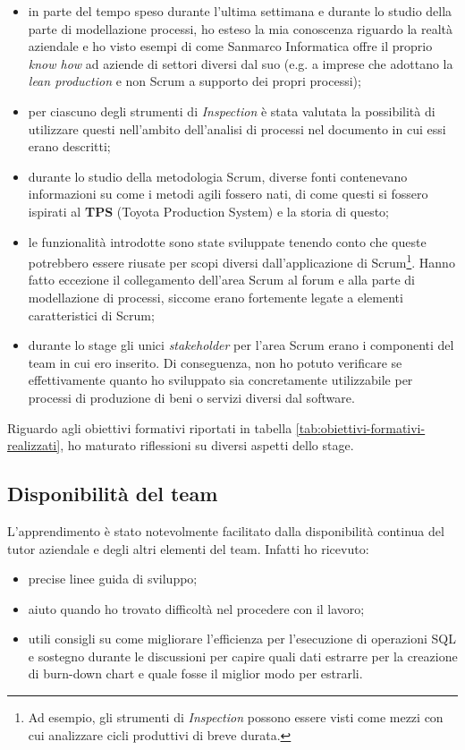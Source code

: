 \begin{itemize}
\item in parte del tempo speso durante l'ultima settimana e durante lo studio
  della parte di modellazione processi, ho esteso la mia conoscenza riguardo
  la realtà aziendale e ho visto esempi di come Sanmarco Informatica offre il
  proprio \emph{know how} ad aziende di settori diversi dal suo (e.g. a imprese
  che adottano la \emph{lean production} e non Scrum a supporto dei propri
  processi);
\item per ciascuno degli strumenti di \emph{Inspection} è stata valutata la
  possibilità di utilizzare questi nell'ambito dell'analisi di processi nel
  documento in cui essi erano descritti;
\item durante lo studio della metodologia Scrum, diverse fonti contenevano
  informazioni su come i metodi agili fossero nati, di come questi si fossero
  ispirati al \textbf{TPS} (Toyota Production System) e la storia di questo;
\item le funzionalità introdotte sono state sviluppate tenendo conto
  che queste potrebbero essere riusate per scopi diversi dall'applicazione di
  Scrum\footnote{Ad esempio, gli strumenti di \emph{Inspection} possono essere
  visti come mezzi con cui analizzare cicli produttivi di breve durata.}. Hanno
  fatto eccezione il collegamento dell'area Scrum al forum e alla parte di
  modellazione di processi, siccome erano fortemente legate a elementi
  caratteristici di Scrum;
\item durante lo stage gli unici \emph{stakeholder} per l'area Scrum erano i
  componenti del team in cui ero inserito. Di conseguenza, non ho potuto
  verificare se effettivamente quanto ho sviluppato sia concretamente
  utilizzabile per processi di produzione di beni o servizi diversi dal
  software.
\end{itemize}

Riguardo agli obiettivi formativi riportati in tabella
\ref{tab:obiettivi-formativi-realizzati}, ho maturato riflessioni su diversi
aspetti dello stage.

\subsection{Disponibilità del team}

L'apprendimento è stato notevolmente facilitato dalla disponibilità continua
del tutor aziendale e degli altri elementi del team. Infatti ho ricevuto:

\begin{itemize}
\item precise linee guida di sviluppo;
\item aiuto quando ho trovato difficoltà nel procedere con il lavoro;
\item utili consigli su come migliorare l'efficienza per l'esecuzione di
  operazioni SQL e sostegno durante le discussioni per capire quali dati
  estrarre per la creazione di burn-down chart e quale fosse il miglior modo
  per estrarli.
\end{itemize}

